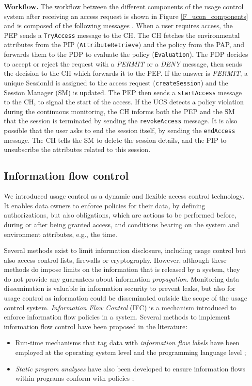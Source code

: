 \textbf{Workflow.} The workflow between the different components of the usage control system after receiving an access request is shown in Figure \ref{F_ucon_components} and is composed of the following messages \cite{Rizos2019}. When a user requires access, the PEP sends a \texttt{TryAccess} message to the CH. The CH fetches the environmental attributes from the PIP (\texttt{\justify AttributeRetrieve}) and the policy from the PAP, and forwards them to the PDP to evaluate the policy (\texttt{Evaluation}). The PDP decides to accept or reject the request with a
 \emph{PERMIT} or a \emph{DENY} message, then sends the decision to the CH which forwards it to the PEP. If the answer is \emph{PERMIT}, a unique SessionId is assigned to the access request (\texttt{createSession}) and the Session Manager (SM) is updated. The PEP then sends a \texttt{startAccess} message to the CH, to signal the start of the access. If the UCS detects a policy violation during the continuous monitoring, the CH informs both the PEP and the SM that the session is terminated by sending the \texttt{revokeAccess} message. It is also possible that the user asks to end the session itself, by sending the \texttt{endAccess} message. The CH tells the SM to delete the session details, and the PIP to unsubscribe the attributes related to this session.

\subsection{Information flow control}
\label{ss_information_flow_control}

We introduced usage control as a dynamic and flexible access control technology. It enables data owners to enforce policies for their data, 
by defining authorizations, but also obligations, which are actions to be performed before, during or after being granted access, and conditions bearing on the system and environment attributes, e.g., the time.

 Several methods exist to limit information disclosure, including usage control but also access control lists, firewalls or cryptography. However, although these methods do impose limits on the information that is released by a system, they do not provide any guarantees about information \emph{propagation}. 
 Monitoring data dissemination is valuable in information security to prevent leaks, but also for usage control as information could be disseminated outside the scope of the usage control system. 
 \emph{Information Flow Control} (IFC) is a mechanism introduced to enforce information flow policies in a system. Several methods to implement information flow control have been proposed in the literature:
 \begin{itemize}
    \item Run-time mechanisms that tag data with \emph{information flow labels} have been employed at the operating system level and the programming language level \cite{Hu2021};
    \item \emph{Static program analyses} have also been developed to ensure information flows within programs conform with policies \cite{Zheng2007};
 \end{itemize} 

